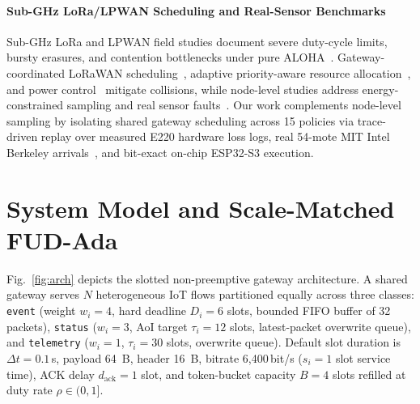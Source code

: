 \documentclass[journal]{IEEEtran}
\begin{document}
\paragraph{Sub-GHz LoRa/LPWAN Scheduling and Real-Sensor Benchmarks}
Sub-GHz LoRa and LPWAN field studies document severe duty-cycle limits, bursty erasures, and contention bottlenecks under pure ALOHA~\cite{augustin2016lora,gilbert1960capacity}. Gateway-coordinated LoRaWAN scheduling~\cite{garridohidalgo2021lorawan}, adaptive priority-aware resource allocation~\cite{lima2021adaptive}, and power control~\cite{algumaei2022lora} mitigate collisions, while node-level studies address energy-constrained sampling and real sensor faults~\cite{rao2019adaptive,arnaiz2024energy,sharma2010faults,harb2024clara,guestrin2004distributed}. Our work complements node-level sampling by isolating shared gateway scheduling across 15 policies via trace-driven replay over measured E220 hardware loss logs, real 54-mote MIT Intel Berkeley arrivals~\cite{madden2004intel}, and bit-exact on-chip ESP32-S3 execution.

\section{System Model and Scale-Matched FUD-Ada}

Fig.~\ref{fig:arch} depicts the slotted non-preemptive gateway architecture. A shared gateway serves $N$ heterogeneous IoT flows partitioned equally across three classes: \texttt{event} (weight $w_i{=}4$, hard deadline $D_i{=}6$ slots, bounded FIFO buffer of 32 packets), \texttt{status} ($w_i{=}3$, AoI target $\tau_i{=}12$ slots, latest-packet overwrite queue), and \texttt{telemetry} ($w_i{=}1$, $\tau_i{=}30$ slots, overwrite queue). Default slot duration is $\Delta t = 0.1$\,s, payload 64~B, header 16~B, bitrate 6,400\,bit/s ($s_i{=}1$ slot service time), ACK delay $d_{\text{ack}}{=}1$ slot, and token-bucket capacity $B{=}4$ slots refilled at duty rate $\rho \in (0,1]$.
\end{document}
